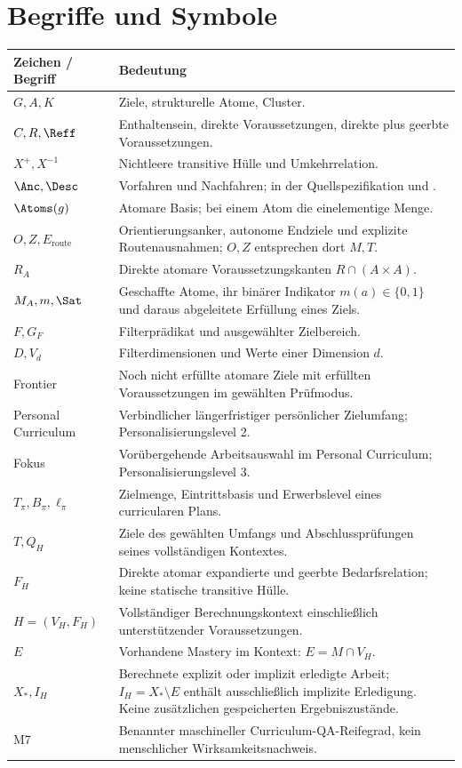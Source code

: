 \section{Begriffe und Symbole}
\begin{longtable}{@{}P{36mm}P{112mm}@{}}
\toprule
Zeichen / Begriff & Bedeutung\\
\midrule\endhead
$G,A,K$ & Ziele, strukturelle Atome, Cluster.\\
$C,R,\Reff$ & Enthaltensein, direkte Voraussetzungen,
direkte plus geerbte Voraussetzungen.\\
$X^+,X^{-1}$ & Nichtleere transitive Hülle und Umkehrrelation.\\
$\Anc,\Desc$ & Vorfahren und Nachfahren; in der Quellspezifikation
 und .\\
$\Atoms(g)$ & Atomare Basis; bei einem Atom die einelementige Menge.\\
$O,Z,E_{\mathrm{route}}$ & Orientierungsanker, autonome Endziele und
explizite Routenausnahmen; $O,Z$ entsprechen dort $M,T$.\\
$R_A$ & Direkte atomare Voraussetzungskanten $R\cap(A\times A)$.\\
$M_A,m,\Sat$ & Geschaffte Atome, ihr binärer Indikator
$m(a)\in\{0,1\}$ und daraus abgeleitete Erfüllung eines Ziels.\\
$F,G_F$ & Filterprädikat und ausgewählter Zielbereich.\\
$D,V_d$ & Filterdimensionen und Werte einer Dimension $d$.\\
Frontier & Noch nicht erfüllte atomare Ziele mit erfüllten
Voraussetzungen im gewählten Prüfmodus.\\
Personal Curriculum & Verbindlicher längerfristiger persönlicher
Zielumfang; Personalisierungslevel 2.\\
Fokus & Vorübergehende Arbeitsauswahl im Personal Curriculum;
Personalisierungslevel 3.\\
$T_\pi,B_\pi,\ell_\pi$ & Zielmenge, Eintrittsbasis und Erwerbslevel
eines curricularen Plans.\\
$T,Q_H$ & Ziele des gewählten Umfangs und Abschlussprüfungen seines vollständigen Kontextes.\\
$F_H$ & Direkte atomar expandierte und geerbte Bedarfsrelation;
keine statische transitive Hülle.\\
$H=(V_H,F_H)$ & Vollständiger Berechnungskontext einschließlich unterstützender Voraussetzungen.\\
$E$ & Vorhandene Mastery im Kontext: $E=M\cap V_H$.\\
$X_*,I_H$ & Berechnete explizit oder implizit erledigte Arbeit;
$I_H=X_*\setminus E$ enthält ausschließlich implizite Erledigung.
Keine zusätzlichen gespeicherten Ergebniszustände.\\
M7 & Benannter maschineller Curriculum-QA-Reifegrad,
kein menschlicher Wirksamkeitsnachweis.\\
\bottomrule
\end{longtable}

